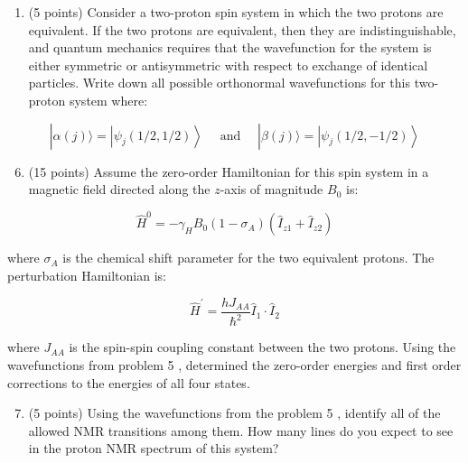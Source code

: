 \documentclass[12pt]{article}
\begin{document}
\begin{enumerate}
\begin{lstlisting}[language=Python]
\end{lstlisting}

  \item (5 points) Consider a two-proton spin system in which the two protons are equivalent. If the two protons are equivalent, then they are indistinguishable, and quantum mechanics requires that the wavefunction for the system is either symmetric or antisymmetric with respect to exchange of identical particles. Write down all possible orthonormal wavefunctions for this two-proton system where:

\end{enumerate}

$$
|\alpha(j)\rangle=\left|\psi_{j}(1 / 2,1 / 2)\right\rangle \quad \text { and } \quad|\beta(j)\rangle=\left|\psi_{j}(1 / 2,-1 / 2)\right\rangle
$$

\begin{enumerate}
  \setcounter{enumi}{5}
  \item (15 points) Assume the zero-order Hamiltonian for this spin system in a magnetic field directed along the $z$-axis of magnitude $B_{0}$ is:
\end{enumerate}

$$
\widehat{H}^{0}=-\gamma_{H} B_{0}\left(1-\sigma_{A}\right)\left(\hat{I}_{z 1}+\hat{I}_{z 2}\right)
$$

where $\sigma_{A}$ is the chemical shift parameter for the two equivalent protons. The perturbation Hamiltonian is:

$$
\widehat{H}^{\prime}=\frac{h J_{A A}}{\hbar^{2}} \hat{I}_{1} \cdot \hat{I}_{2}
$$

where $J_{A A}$ is the spin-spin coupling constant between the two protons. Using the wavefunctions from problem 5 , determined the zero-order energies and first order corrections to the energies of all four states.

\begin{enumerate}
  \setcounter{enumi}{6}
  \item (5 points) Using the wavefunctions from the problem 5 , identify all of the allowed NMR transitions among them. How many lines do you expect to see in the proton NMR spectrum of this system?
\end{enumerate}
\end{document}
